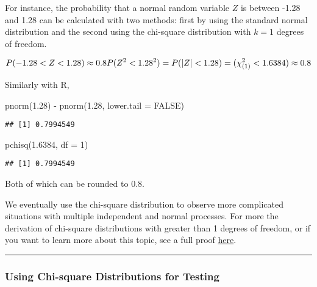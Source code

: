 \documentclass[
]{article}
\newenvironment{Shaded}{\begin{snugshade}}{\end{snugshade}}
\newcommand{\AttributeTok}[1]{\textcolor[rgb]{0.77,0.63,0.00}{#1}}
\newcommand{\ConstantTok}[1]{\textcolor[rgb]{0.00,0.00,0.00}{#1}}
\newcommand{\DecValTok}[1]{\textcolor[rgb]{0.00,0.00,0.81}{#1}}
\newcommand{\FloatTok}[1]{\textcolor[rgb]{0.00,0.00,0.81}{#1}}
\newcommand{\FunctionTok}[1]{\textcolor[rgb]{0.00,0.00,0.00}{#1}}
\newcommand{\NormalTok}[1]{#1}
\newcommand{\SpecialCharTok}[1]{\textcolor[rgb]{0.00,0.00,0.00}{#1}}
\begin{document}
For instance, the probability that a normal random variable \(Z\) is between -1.28 and 1.28 can be calculated with two methods: first by using the standard normal distribution and the second using the chi-square distribution with \(k=1\) degrees of freedom.

\[ P(-1.28 < Z <1.28) \approx 0.8 \\ P(Z^2<1.28^2) = P(|Z| < 1.28) =(\chi^2_{(1)}<1.6384) \approx 0.8\]

Similarly with R,

\begin{Shaded}
\begin{Highlighting}[]
\FunctionTok{pnorm}\NormalTok{(}\FloatTok{1.28}\NormalTok{) }\SpecialCharTok{{-}} \FunctionTok{pnorm}\NormalTok{(}\FloatTok{1.28}\NormalTok{, }\AttributeTok{lower.tail =} \ConstantTok{FALSE}\NormalTok{)}
\end{Highlighting}
\end{Shaded}

\begin{verbatim}
## [1] 0.7994549
\end{verbatim}

\begin{Shaded}
\begin{Highlighting}[]
\FunctionTok{pchisq}\NormalTok{(}\FloatTok{1.6384}\NormalTok{, }\AttributeTok{df =} \DecValTok{1}\NormalTok{)}
\end{Highlighting}
\end{Shaded}

\begin{verbatim}
## [1] 0.7994549
\end{verbatim}

Both of which can be rounded to 0.8.

We eventually use the chi-square distribution to observe more complicated situations with multiple independent and normal processes. For more the derivation of chi-square distributions with greater than 1 degrees of freedom, or if you want to learn more about this topic, see a full proof \href{https://en.wikipedia.org/wiki/Proofs_related_to_chi-squared_distribution}{here}.

\begin{center}\rule{0.5\linewidth}{0.5pt}\end{center}

\hypertarget{using-chi-square-distributions-for-testing}{%
\subsubsection{Using Chi-square Distributions for Testing}\label{using-chi-square-distributions-for-testing}}
\end{document}
